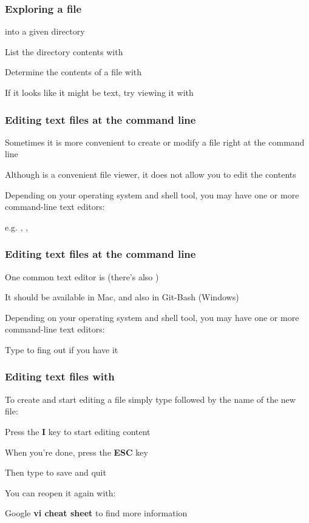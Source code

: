 \documentclass[12pt]{beamer}\usepackage[]{graphicx}\usepackage[]{color}
\begin{document}

\begin{frame}
\frametitle{Exploring a file}
\bi
  \item {} into a given directory
  \item List the directory contents with 
  \item Determine the contents of a file with 
  \item If it looks like it might be text, try viewing it with 
\ei
\end{frame}


\begin{frame}
\frametitle{Editing text files at the command line}
\bi
  \item Sometimes it is more convenient to create or modify a file right at the command line
  \item Although  is a convenient file viewer, it does not allow you to edit the contents
  \item Depending on your operating system and shell tool, you may have one or more command-line text editors:
  \item e.g. , , 
\ei
\end{frame}


\begin{frame}
\frametitle{Editing text files at the command line}
\bi
  \item One common text editor is  (there's also )
  \item It should be available in Mac, and also in Git-Bash (Windows)
  \item Depending on your operating system and shell tool, you may have one or more command-line text editors:
  \item Type {\hilit {}} to fing out if you have it
\ei
\end{frame}


\begin{frame}
\frametitle{Editing text files with }
\bi
  \item To create and start editing a file simply type  followed by the name of the new file:
  \item[] {\hilit {}}
  \item Press the \textbf{I} key to start editing content
  \item When you're done, press the \textbf{ESC} key
  \item Then type  to save and quit
  \item You can reopen it again with: 
\ei

Google \textbf{vi cheat sheet} to find more information
\end{frame}
\end{document}
